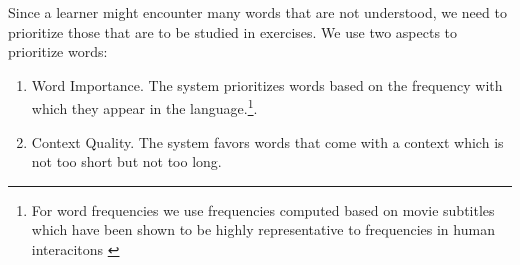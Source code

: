 
Since a learner might encounter many words that are not understood, we need to prioritize those that are to be studied in exercises. We use two aspects to prioritize words: 


\begin{enumerate}

  \item Word Importance. The system prioritizes words based on the frequency with which they appear in the language.\footnote{For word frequencies we use frequencies computed based on movie subtitles which have been shown to be highly representative to frequencies in human interacitons \cite{New07-subtitles}}. 
  
  \item Context Quality. The system favors words that come with a context which is not too short but not too long. 

\end{enumerate}


